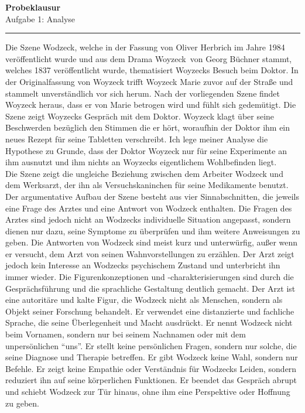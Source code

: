 \documentclass[a4paper,12pt]{report}
\begin{document}
	\noindent
	\Large
	\textbf{Probeklausur}
	\\
	Aufgabe 1: Analyse
	\hrule
	\vspace{0.5cm}
	\noindent
	\large
	Die Szene \dq Wodzeck\dq, welche in der Fassung von Oliver Herbrich im Jahre 1984 veröffentlicht wurde und aus dem Drama \dq Woyzeck\dq\ von Georg Büchner stammt, welches 1837 veröffentlicht wurde, thematisiert Woyzecks Besuch beim Doktor.
	In der Originalfassung von Woyzeck trifft Woyzeck Marie zuvor auf der Straße und stammelt unverständlich vor sich herum.
	Nach der vorliegenden Szene findet Woyzeck heraus, dass er von Marie betrogen wird und fühlt sich gedemütigt.
	Die Szene zeigt Woyzecks Gespräch mit dem Doktor.
	Woyzeck klagt über seine Beschwerden bezüglich den Stimmen die er hört, woraufhin der Doktor ihm ein neues Rezept für seine Tabletten verschreibt.
	Ich lege meiner Analyse die Hypothese zu Grunde, dass der Doktor Woyzeck nur für seine Experimente an ihm ausnutzt und ihm nichts an Woyzecks eigentlichem Wohlbefinden liegt.
	\\
	Die Szene zeigt die ungleiche Beziehung zwischen dem Arbeiter Wodzeck und dem Werksarzt, der ihn als Versuchskaninchen für seine Medikamente benutzt. Der argumentative Aufbau der Szene besteht aus vier Sinnabschnitten, die jeweils eine Frage des Arztes und eine Antwort von Wodzeck enthalten.
	Die Fragen des Arztes sind jedoch nicht an Wodzecks individuelle Situation angepasst, sondern dienen nur dazu, seine Symptome zu überprüfen und ihm weitere Anweisungen zu geben.
	Die Antworten von Wodzeck sind meist kurz und unterwürfig, außer wenn er versucht, dem Arzt von seinen Wahnvorstellungen zu erzählen.
	Der Arzt zeigt jedoch kein Interesse an Wodzecks psychischem Zustand und unterbricht ihn immer wieder.
	Die Figurenkonzeptionen und -charakterisierungen sind durch die Gesprächsführung und die sprachliche Gestaltung deutlich gemacht.
	Der Arzt ist eine autoritäre und kalte Figur, die Wodzeck nicht als Menschen, sondern als Objekt seiner Forschung behandelt.
	Er verwendet eine distanzierte und fachliche Sprache, die seine Überlegenheit und Macht ausdrückt. Er nennt Wodzeck nicht beim Vornamen, sondern nur bei seinem Nachnamen oder mit dem unpersönlichen “uns”.
	Er stellt keine persönlichen Fragen, sondern nur solche, die seine Diagnose und Therapie betreffen.
	Er gibt Wodzeck keine Wahl, sondern nur Befehle. Er zeigt keine Empathie oder Verständnis für Wodzecks Leiden, sondern reduziert ihn auf seine körperlichen Funktionen.
	Er beendet das Gespräch abrupt und schiebt Wodzeck zur Tür hinaus, ohne ihm eine Perspektive oder Hoffnung zu geben.
\end{document}
